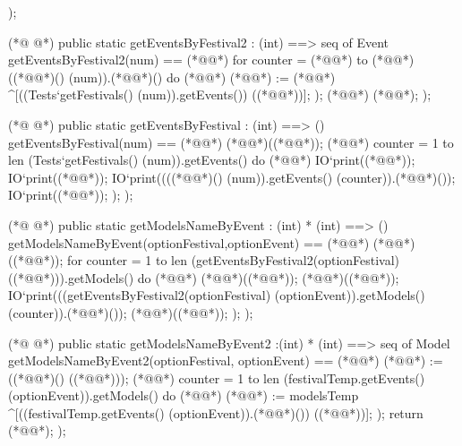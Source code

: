 \begin{vdmpp}[breaklines=true]
  );
 
(*@
\label{getEventsByFestival2:104}
@*)
 public static getEventsByFestival2 : (int) ==> seq of Event
  getEventsByFestival2(num) == (*@\vdmnotcovered{(}@*)
    for counter = (*@@*) to (*@@*) ((*@@*)() (num)).(*@@*)() do (*@\vdmnotcovered{(}@*)
    (*@@*) := (*@@*) ^[((Tests`getFestivals() (num)).getEvents()) ((*@@*))];
   );
   (*@@*) (*@@*);
  );
 
(*@
\label{getEventsByFestival:112}
@*)
 public static getEventsByFestival : (int) ==> ()
  getEventsByFestival(num) == (*@\vdmnotcovered{(}@*)
      (*@@*)((*@@*));
    (*@@*) counter = 1 to len (Tests`getFestivals() (num)).getEvents() do (*@\vdmnotcovered{(}@*)
    IO`print((*@@*));
    IO`print((*@@*));
    IO`print((((*@@*)() (num)).getEvents() (counter)).(*@@*)());
    IO`print((*@@*));
  );
  );
  

    
(*@
\label{getModelsNameByEvent:125}
@*)
 public static getModelsNameByEvent : (int) * (int) ==> ()
  getModelsNameByEvent(optionFestival,optionEvent) == (*@\vdmnotcovered{(}@*)
      (*@@*)((*@@*));
    for counter = 1 to len (getEventsByFestival2(optionFestival) ((*@@*))).getModels() do (*@\vdmnotcovered{(}@*)
    (*@@*)((*@@*));
    (*@@*)((*@@*));
    IO`print(((getEventsByFestival2(optionFestival) (optionEvent)).getModels() (counter)).(*@@*)());
    (*@@*)((*@@*));
  );
  );
  
(*@
\label{getModelsNameByEvent2:136}
@*)
  public static getModelsNameByEvent2 :(int) * (int) ==> seq of Model
  getModelsNameByEvent2(optionFestival, optionEvent) == (*@\vdmnotcovered{(}@*)
  (*@@*) := ((*@@*)() ((*@@*)));
    (*@@*) counter = 1 to len (festivalTemp.getEvents() (optionEvent)).getModels() do (*@\vdmnotcovered{(}@*)
    (*@@*) := modelsTemp ^[((festivalTemp.getEvents() (optionEvent)).(*@@*)()) ((*@@*))];
   );
   return (*@@*);
  );
  

\end{vdmpp}
